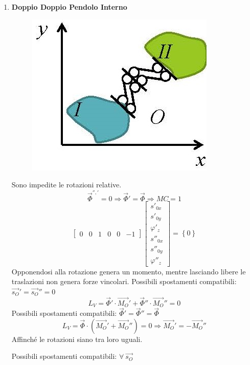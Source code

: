 \documentclass{article}
\begin{document}
\begin{adjustwidth}{2in}{}
\begin{enumerate}
\item \textbf{Doppio Doppio Pendolo Interno} \newline	
	\begin{figure}[H]
	\centering
	\includegraphics[width=0.25\linewidth]{immagini/1.PARTE2_Pagina_14}
\end{figure}
Sono impedite le rotazioni relative.
\[
\vec{\Phi}^{'', '} = 0 \Rightarrow \vec{\Phi}'= \vec{\Phi} \Rightarrow MC =1 
\]
\[
\left[ \begin{array}{cccccc}
	0 & 0 & 1 & 0 & 0 & -1 
		
\end{array}\right] \left[ \begin{array}{c}
	s'_{0x} \\
	s'_{0y} \\
	\varphi'_z \\
	s''_{0x} \\
	s''_{0y} \\
	\varphi''_z
\end{array}\right] = \left\lbrace 0 \right\rbrace
\]
Opponendosi alla rotazione genera un momento, mentre lasciando libere le traslazioni non genera forze vincolari. 
Possibili spostamenti compatibili: $ \vec{s_O}' = \vec{s_O}'' = 0$
\[ 
L_{V} =  \vec{\Phi}' \cdot \vec{M_O}'+ \vec{\Phi}'' \cdot \vec{M_O}'' = 0
\]
Possibili spostamenti compatibili: $ \vec{\Phi}' = \vec{\Phi}'' = \vec{\Phi}$
\[
L_{V} =  \vec{\Phi} \cdot (\vec{M_O}' + \vec{M_O}'') = 0 \Rightarrow \vec{M_O}' = - \vec{M_O}''
\]
Affinché le rotazioni siano tra loro uguali.

Possibili spostamenti compatibili: $ \forall ~\vec{s_O}$



\end{enumerate}
\end{adjustwidth}
\end{document}
